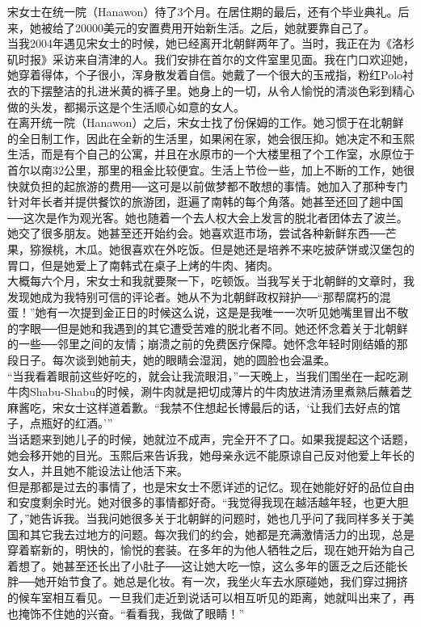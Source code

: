 宋女士在统一院（Hanawon）待了3个月。在居住期的最后，还有个毕业典礼。后来，她被给了20000美元的安置费用开始新生活。之后，她就要靠自己了。\\

当我2004年遇见宋女士的时候，她已经离开北朝鲜两年了。当时，我正在为《洛杉矶时报》采访来自清津的人。我们安排在首尔的文件室里见面。我在门口欢迎她，她穿着得体，个子很小，浑身散发着自信。她戴了一个很大的玉戒指，粉红Polo衬衣的下摆整洁的扎进米黄的裤子里。她身上的一切，从令人愉悦的清淡色彩到精心做的头发，都揭示这是个生活顺心如意的女人。\\

在离开统一院（Hanawon）之后，宋女士找了份保姆的工作。她习惯于在北朝鲜的全日制工作，因此在全新的生活里，如果闲在家，她会很压抑。她决定不和玉熙生活，而是有个自己的公寓，并且在水原市的一个大楼里租了个工作室，水原位于首尔以南32公里，那里的租金比较便宜。生活上节俭一些，加上不断的工作，她很快就负担的起旅游的费用──这可是以前做梦都不敢想的事情。她加入了那种专门针对年长者并提供餐饮的旅游团，逛遍了南韩的每个角落。她甚至还回了趟中国──这次是作为观光客。她也随着一个去人权大会上发言的脱北者团体去了波兰。她交了很多朋友。她甚至还开始约会。她喜欢逛市场，尝试各种新鲜东西──芒果，猕猴桃，木瓜。她很喜欢在外吃饭。但是她还是培养不来吃披萨饼或汉堡包的胃口，但是她爱上了南韩式在桌子上烤的牛肉、猪肉。\\

大概每六个月，宋女士和我就要聚一下，吃顿饭。当我写关于北朝鲜的文章时，我发现她成为我特别可信的评论者。她从不为北朝鲜政权辩护──“那帮腐朽的混蛋！”她有一次提到金正日的时候这么说，这是是我唯一一次听见她嘴里冒出不敬的字眼──但是她和我遇到的其它遭受苦难的脱北者不同。她还怀念着关于北朝鲜的一些──邻里之间的友情；崩溃之前的免费医疗保障。她怀念年轻时刚结婚的那段日子。每次谈到她前夫，她的眼睛会湿润，她的圆脸也会温柔。\\

“当我看着眼前这些好吃的，就会让我流眼泪，”一天晚上，当我们围坐在一起吃涮牛肉Shabu-Shabu的时候，涮牛肉就是把切成薄片的牛肉放进清汤里煮熟后蘸着芝麻酱吃，宋女士这样道着歉。“我禁不住想起长博最后的话，‘让我们去好点的馆子，点瓶好的红酒。’”\\

当话题来到她儿子的时候，她就泣不成声，完全开不了口。如果我提起这个话题，她会移开她的目光。玉熙后来告诉我，她母亲永远不能原谅自己反对他爱上年长的女人，并且她不能设法让他活下来。\\

但是那都是过去的事情了，也是宋女士不愿详述的记忆。现在她能好好的品位自由和安度剩余时光。她对很多的事情都好奇。“我觉得我现在越活越年轻，也更大胆了，”她告诉我。当我问她很多关于北朝鲜的问题时，她也几乎问了我同样多关于美国和其它我去过地方的问题。每次我们的约会，她都是充满激情活力的出现，总是穿着崭新的，明快的，愉悦的套装。在多年的为他人牺牲之后，现在她开始为自己着想了。她甚至还长出了小肚子──这让她大吃一惊，这么多年的匮乏之后还能长胖──她开始节食了。她总是化妆。有一次，我坐火车去水原碰她，我们穿过拥挤的候车室相互看见。一旦我们走近到说话可以相互听见的距离，她就叫出来了，再也掩饰不住她的兴奋。“看看我，我做了眼睛！”\\

